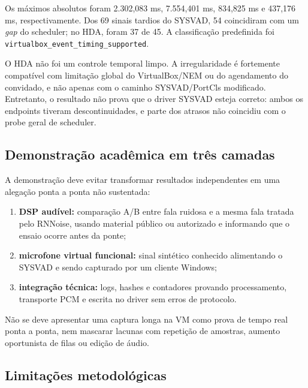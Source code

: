 Os máximos absolutos foram 2.302,083 ms, 7.554,401 ms, 834,825 ms e 437,176 ms, respectivamente. Dos 69 sinais tardios do SYSVAD, 54 coincidiram com um \textit{gap} do scheduler; no HDA, foram 37 de 45. A classificação predefinida foi \texttt{virtualbox\_event\_timing\_supported}.

O HDA não foi um controle temporal limpo. A irregularidade é fortemente compatível com limitação global do VirtualBox/NEM ou do agendamento do convidado, e não apenas com o caminho SYSVAD/PortCls modificado. Entretanto, o resultado não prova que o driver SYSVAD esteja correto: ambos os endpoints tiveram descontinuidades, e parte dos atrasos não coincidiu com o probe geral de scheduler.

\subsection{Demonstração acadêmica em três camadas}

A demonstração deve evitar transformar resultados independentes em uma alegação ponta a ponta não sustentada:

\begin{enumerate}
    \item \textbf{DSP audível:} comparação A/B entre fala ruidosa e a mesma fala tratada pelo RNNoise, usando material público ou autorizado e informando que o ensaio ocorre antes da ponte;
    \item \textbf{microfone virtual funcional:} sinal sintético conhecido alimentando o SYSVAD e sendo capturado por um cliente Windows;
    \item \textbf{integração técnica:} logs, hashes e contadores provando processamento, transporte PCM e escrita no driver sem erros de protocolo.
\end{enumerate}

Não se deve apresentar uma captura longa na VM como prova de tempo real ponta a ponta, nem mascarar lacunas com repetição de amostras, aumento oportunista de filas ou edição de áudio.

\subsection{Limitações metodológicas}

